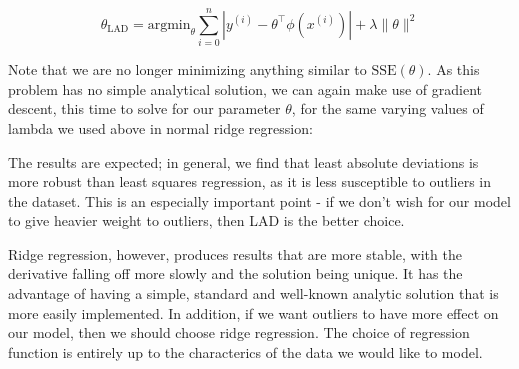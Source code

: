 \documentclass[10pt,letterpaper]{article}
\begin{document}
$$\theta_{\text{LAD}} = \text{argmin}_\theta\sum_{i=0}^n|y^{(i)} - \theta^\intercal\phi(x^{(i)})| + \lambda\lVert\theta\rVert^2$$

Note that we are no longer minimizing anything similar to $\text{SSE}(\theta)$. As this problem has no simple analytical solution, we can again make use of gradient descent, this time to solve for our parameter $\theta$, for the same varying values of lambda we used above in normal ridge regression:

The results are expected; in general, we find that least absolute deviations is more robust than least squares regression, as it is less susceptible to outliers in the dataset. This is an especially important point - if we don't wish for our model to give heavier weight to outliers, then LAD is the better choice.

Ridge regression, however, produces results that are more stable, with the derivative falling off more slowly and the solution being unique. It has the advantage of having a simple, standard and well-known analytic solution that is more easily implemented. In addition, if we want outliers to have more effect on our model, then we should choose ridge regression. The choice of regression function is entirely up to the characterics of the data we would like to model.
\end{document}
